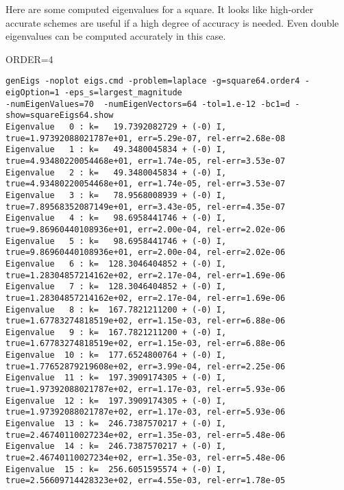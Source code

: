 Here are some computed eigenvalues for a square. It looks like high-order accurate schemes are
useful if a high degree of accuracy is needed. Even double eigenvalues can be computed accurately in this case.

\mni
ORDER=4
\begin{Verbatim}[fontsize=\footnotesize]
genEigs -noplot eigs.cmd -problem=laplace -g=square64.order4 -eigOption=1 -eps_s=largest_magnitude 
-numEigenValues=70  -numEigenVectors=64 -tol=1.e-12 -bc1=d -show=squareEigs64.show
Eigenvalue   0 : k=   19.7392082729 + (-0) I,  true=1.97392088021787e+01, err=5.29e-07, rel-err=2.68e-08
Eigenvalue   1 : k=   49.3480045834 + (-0) I,  true=4.93480220054468e+01, err=1.74e-05, rel-err=3.53e-07
Eigenvalue   2 : k=   49.3480045834 + (-0) I,  true=4.93480220054468e+01, err=1.74e-05, rel-err=3.53e-07
Eigenvalue   3 : k=   78.9568008939 + (-0) I,  true=7.89568352087149e+01, err=3.43e-05, rel-err=4.35e-07
Eigenvalue   4 : k=   98.6958441746 + (-0) I,  true=9.86960440108936e+01, err=2.00e-04, rel-err=2.02e-06
Eigenvalue   5 : k=   98.6958441746 + (-0) I,  true=9.86960440108936e+01, err=2.00e-04, rel-err=2.02e-06
Eigenvalue   6 : k=  128.3046404852 + (-0) I,  true=1.28304857214162e+02, err=2.17e-04, rel-err=1.69e-06
Eigenvalue   7 : k=  128.3046404852 + (-0) I,  true=1.28304857214162e+02, err=2.17e-04, rel-err=1.69e-06
Eigenvalue   8 : k=  167.7821211200 + (-0) I,  true=1.67783274818519e+02, err=1.15e-03, rel-err=6.88e-06
Eigenvalue   9 : k=  167.7821211200 + (-0) I,  true=1.67783274818519e+02, err=1.15e-03, rel-err=6.88e-06
Eigenvalue  10 : k=  177.6524800764 + (-0) I,  true=1.77652879219608e+02, err=3.99e-04, rel-err=2.25e-06
Eigenvalue  11 : k=  197.3909174305 + (-0) I,  true=1.97392088021787e+02, err=1.17e-03, rel-err=5.93e-06
Eigenvalue  12 : k=  197.3909174305 + (-0) I,  true=1.97392088021787e+02, err=1.17e-03, rel-err=5.93e-06
Eigenvalue  13 : k=  246.7387570217 + (-0) I,  true=2.46740110027234e+02, err=1.35e-03, rel-err=5.48e-06
Eigenvalue  14 : k=  246.7387570217 + (-0) I,  true=2.46740110027234e+02, err=1.35e-03, rel-err=5.48e-06
Eigenvalue  15 : k=  256.6051595574 + (-0) I,  true=2.56609714428323e+02, err=4.55e-03, rel-err=1.78e-05
\end{Verbatim}


